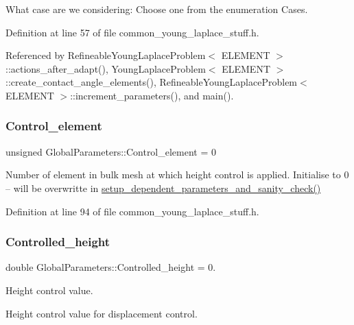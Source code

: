 What case are we considering\+: Choose one from the enumeration Cases. 



Definition at line 57 of file common\+\_\+young\+\_\+laplace\+\_\+stuff.\+h.



Referenced by Refineable\+Young\+Laplace\+Problem$<$ E\+L\+E\+M\+E\+N\+T $>$\+::actions\+\_\+after\+\_\+adapt(), Young\+Laplace\+Problem$<$ E\+L\+E\+M\+E\+N\+T $>$\+::create\+\_\+contact\+\_\+angle\+\_\+elements(), Refineable\+Young\+Laplace\+Problem$<$ E\+L\+E\+M\+E\+N\+T $>$\+::increment\+\_\+parameters(), and main().

\mbox{\label{namespaceGlobalParameters_a3a90a762edbce6d2a95456df26e85cea}} 
\subsubsection{\texorpdfstring{Control\+\_\+element}{Control\_element}}
{\footnotesize\ttfamily unsigned Global\+Parameters\+::\+Control\+\_\+element = 0}

Number of element in bulk mesh at which height control is applied. Initialise to 0 -- will be overwritte in \hyperlink{namespaceGlobalParameters_aedbc21f2c81d445634badfc5cdd77436}{setup\+\_\+dependent\+\_\+parameters\+\_\+and\+\_\+sanity\+\_\+check()} 

Definition at line 94 of file common\+\_\+young\+\_\+laplace\+\_\+stuff.\+h.

\mbox{\label{namespaceGlobalParameters_a3731f24a02ce4f306d65a9a488f85c96}} 
\subsubsection{\texorpdfstring{Controlled\+\_\+height}{Controlled\_height}}
{\footnotesize\ttfamily double Global\+Parameters\+::\+Controlled\+\_\+height = 0.}



Height control value. 

Height control value for displacement control. 

